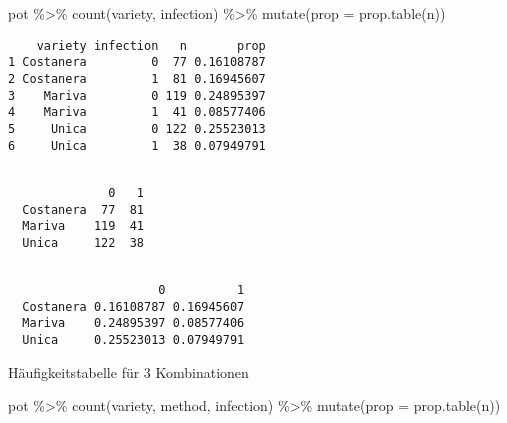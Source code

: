 \documentclass[
  letterpaper,
  DIV=11,
  numbers=noendperiod]{scrartcl}
\newenvironment{Shaded}{\begin{snugshade}}{\end{snugshade}}
\newcommand{\AttributeTok}[1]{\textcolor[rgb]{0.40,0.45,0.13}{#1}}
\newcommand{\CommentTok}[1]{\textcolor[rgb]{0.37,0.37,0.37}{#1}}
\newcommand{\FunctionTok}[1]{\textcolor[rgb]{0.28,0.35,0.67}{#1}}
\newcommand{\NormalTok}[1]{\textcolor[rgb]{0.00,0.23,0.31}{#1}}
\newcommand{\SpecialCharTok}[1]{\textcolor[rgb]{0.37,0.37,0.37}{#1}}
\begin{document}
\begin{Shaded}
\begin{Highlighting}[]
\NormalTok{pot }\SpecialCharTok{\%\textgreater{}\%} \FunctionTok{count}\NormalTok{(variety, infection) }\SpecialCharTok{\%\textgreater{}\%} 
  \FunctionTok{mutate}\NormalTok{(}\AttributeTok{prop =} \FunctionTok{prop.table}\NormalTok{(n))}
\end{Highlighting}
\end{Shaded}

\begin{verbatim}
    variety infection   n       prop
1 Costanera         0  77 0.16108787
2 Costanera         1  81 0.16945607
3    Mariva         0 119 0.24895397
4    Mariva         1  41 0.08577406
5     Unica         0 122 0.25523013
6     Unica         1  38 0.07949791
\end{verbatim}

\begin{Shaded}
\end{Shaded}

\begin{verbatim}
           
              0   1
  Costanera  77  81
  Mariva    119  41
  Unica     122  38
\end{verbatim}

\begin{Shaded}
\end{Shaded}

\begin{verbatim}
           
                     0          1
  Costanera 0.16108787 0.16945607
  Mariva    0.24895397 0.08577406
  Unica     0.25523013 0.07949791
\end{verbatim}

Häufigkeitstabelle für 3 Kombinationen

\begin{Shaded}
\begin{Highlighting}[]
\NormalTok{pot }\SpecialCharTok{\%\textgreater{}\%} \FunctionTok{count}\NormalTok{(variety, method, infection) }\SpecialCharTok{\%\textgreater{}\%} 
  \FunctionTok{mutate}\NormalTok{(}\AttributeTok{prop =} \FunctionTok{prop.table}\NormalTok{(n))}
\end{Highlighting}
\end{Shaded}
\end{document}
